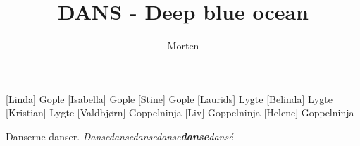 \documentclass[a4paper,11pt]{article}
\title{DANS - Deep blue ocean}
\author{Morten}
\begin{document}
\maketitle

\begin{roles}
  [Linda] Gople
  [Isabella] Gople
  [Stine] Gople
  [Laurids] Lygte
  [Belinda] Lygte
  [Kristian] Lygte
  [Valdbjørn] Goppelninja
  [Liv] Goppelninja
  [Helene] Goppelninja
\end{roles}


\begin{center}
\end{center}

\begin{song}
  \scene Danserne danser. \newline
  \emph{Dansedan\textit{sedan}sedanse\textbf{danse}dansé}
\end{song}
\end{document}

